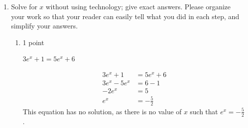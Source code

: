 \documentclass{article}
\begin{document}
\begin{enumerate}
\begin{enumerate}
    \begin{solution}
      \begin{align*}
        \ln\!\left( \sqrt{x} \right) + \ln\!\left( ex^3 \right) - 2\ln x 
        &= 4 \\
        \ln\!\left( \sqrt{x} \right) + + \ln e + 
        \ln\!\left(x^3 \right) - 2\ln x &= 4 \\
        \tfrac{1}{2}\ln x + 1 + 3\ln x - 2 \ln x &= 4 \\
        \tfrac{3}{2}\ln x + 1 &= 4 \\
        \tfrac{3}{2}\ln x &= 3 \\
        \ln x &= 2 \\
        x &= \boxed{e^2}
      \end{align*}
    \end{solution}

  \item

    \begin{grading}
      0.5 points, any answer is fine.
    \end{grading}

    \begin{problem}[\nstretch{0.25}]
      Which way did you prefer? 
    \end{problem}

    \begin{solution}
      This is totally up to you!
    \end{solution}

  \end{enumerate}

\item %

  Solve for $x$ without using technology; give exact answers. Please organize your work so that your reader can easily tell what you did in each step, and simplify your answers. 

  \begin{enumerate}

  \item

    \begin{grading}
      1 point
    \end{grading}

    \begin{problem}[\vfill]
      $\displaystyle 3 e^x+1=5e^x + 6$
    \end{problem}

    \begin{solution}
    \begin{align*}
      3 e^x + 1 &= 5e^x +6 \\
      3  e^x -5e^x &= 6 -1 \\
      -2 e^x &= 5 \\
      e^x &= -\frac{ 5} {2} 
    \end{align*}
      This equation has no solution, as there is no value of $x$ 
      such that $e^x = -\tfrac{5}{2}$.
    \end{solution}


\end{enumerate}
\end{enumerate}
\end{document}
